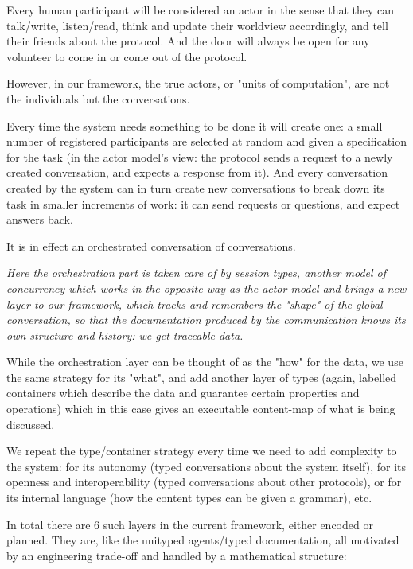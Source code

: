 \documentclass[11pt]{article}
\begin{document}
Every human participant will be considered an actor in the sense that they can talk/write, listen/read, think and update their worldview accordingly, and tell their friends about the protocol. And the door will always be open for any volunteer to come in or come out of the protocol.

However, in our framework, the true actors, or "units of computation", are not the individuals but the conversations.

Every time the system needs something to be done it will create one: a small number of registered participants are selected at random and given a specification for the task (in the actor model's view: the protocol sends a request to a newly created conversation, and expects a response from it). And every conversation created by the system can in turn create new conversations to break down its task in smaller increments of work: it can send requests or questions, and expect answers back.

It is in effect an orchestrated conversation of conversations.

\emph{Here the orchestration part is taken care of by session types, another model of concurrency which works in the opposite way as the actor model and brings a new layer to our framework, which tracks and remembers the "shape" of the global conversation, so that the documentation produced by the communication knows its own structure and history: we get traceable data.}

While the orchestration layer can be thought of as the "how" for the data, we use the same strategy for its "what", and add another layer of types (again, labelled containers which describe the data and guarantee certain properties and operations) which in this case gives an executable content-map of what is being discussed.

We repeat the type/container strategy every time we need to add complexity to the system: for its autonomy (typed conversations about the system itself), for its openness and interoperability (typed conversations about other protocols), or for its internal language (how the content types can be given a grammar), etc.

In total there are 6 such layers in the current framework, either encoded or planned. They are, like the unityped agents/typed documentation, all motivated by an engineering trade-off and handled by a mathematical structure:
\end{document}
